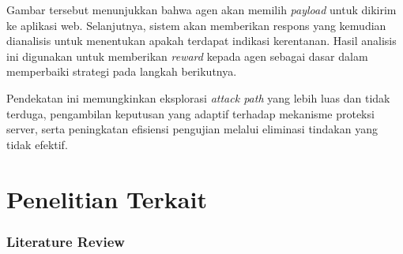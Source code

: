 Gambar tersebut menunjukkan bahwa agen akan memilih \textit{payload} untuk dikirim ke aplikasi web. Selanjutnya, sistem akan memberikan respons yang kemudian dianalisis untuk menentukan apakah terdapat indikasi kerentanan. Hasil analisis ini digunakan untuk memberikan \textit{reward} kepada agen sebagai dasar dalam memperbaiki strategi pada langkah berikutnya.

Pendekatan ini memungkinkan eksplorasi \textit{attack path} yang lebih luas dan tidak terduga, pengambilan keputusan yang adaptif terhadap mekanisme proteksi server, serta peningkatan efisiensi pengujian melalui eliminasi tindakan yang tidak efektif.

\section{Penelitian Terkait}

\subsubsection{Literature Review}


